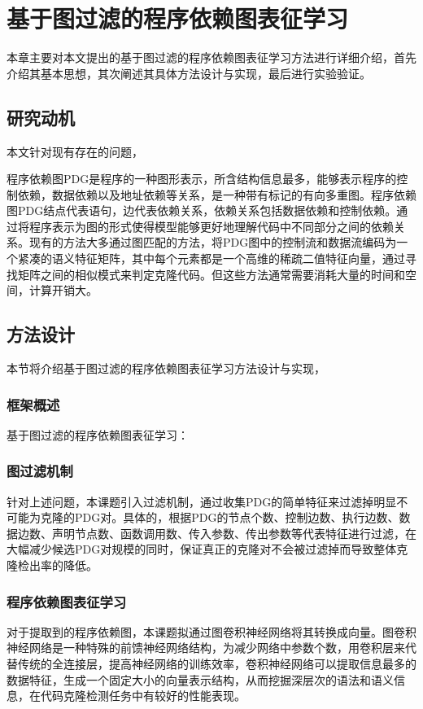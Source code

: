 \chapter{基于图过滤的程序依赖图表征学习}
\label{chap:PDG}
本章主要对本文提出的基于图过滤的程序依赖图表征学习方法进行详细介绍，首先介绍其基本思想，其次阐述其具体方法设计与实现，最后进行实验验证。
\section{研究动机}
本文针对现有存在的问题，

程序依赖图PDG是程序的一种图形表示，所含结构信息最多，能够表示程序的控制依赖，数据依赖以及地址依赖等关系，是一种带有标记的有向多重图。程序依赖图PDG结点代表语句，边代表依赖关系，依赖关系包括数据依赖和控制依赖。通过将程序表示为图的形式使得模型能够更好地理解代码中不同部分之间的依赖关系。现有的方法大多通过图匹配的方法，将PDG图中的控制流和数据流编码为一个紧凑的语义特征矩阵，其中每个元素都是一个高维的稀疏二值特征向量，通过寻找矩阵之间的相似模式来判定克隆代码。但这些方法通常需要消耗大量的时间和空间，计算开销大。
\section{方法设计}
本节将介绍基于图过滤的程序依赖图表征学习方法设计与实现， 

\subsection{框架概述}
基于图过滤的程序依赖图表征学习：

\subsection{图过滤机制}
针对上述问题，本课题引入过滤机制，通过收集PDG的简单特征来过滤掉明显不可能为克隆的PDG对。具体的，根据PDG的节点个数、控制边数、执行边数、数据边数、声明节点数、函数调用数、传入参数、传出参数等代表特征进行过滤，在大幅减少候选PDG对规模的同时，保证真正的克隆对不会被过滤掉而导致整体克隆检出率的降低。

\subsection{程序依赖图表征学习}
对于提取到的程序依赖图，本课题拟通过图卷积神经网络将其转换成向量。图卷积神经网络是一种特殊的前馈神经网络结构，为减少网络中参数个数，用卷积层来代替传统的全连接层，提高神经网络的训练效率，卷积神经网络可以提取信息最多的数据特征，生成一个固定大小的向量表示结构，从而挖掘深层次的语法和语义信息，在代码克隆检测任务中有较好的性能表现。
